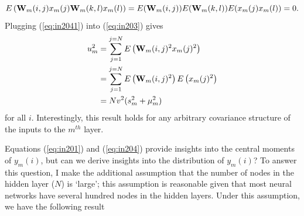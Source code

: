\documentclass[a4paper]{article}
\newcommand{\enum}[1]{\label{eq:#1}}
\newcommand{\eref}[1]{(\ref {eq:#1})}
\newcommand{\be}{\begin{equation}}
\newcommand{\ee}{\end{equation}}
\begin{document}
\newline
\be 
E\left({\bf{W}}_{m}(i,j)x_{m}(j){\bf{W}}_{m}(k,l)x_{m}(l)\right) = E({\bf{W}}_{m}(i,j))E({\bf{W}}_{m}(k,l))E(x_{m}(j)x_{m}(l)) = 0. \enum{in2041}
\ee
\newline
Plugging \eref{in2041} into \eref{in203} gives
\be 
\begin{split}
u_{m}^{2} &= \sum\limits_{j=1}^{j=N} E\left({\bf{W}}_{m}(i,j)^{2}x_{m}(j)^{2}\right) \\ 
&= \sum\limits_{j=1}^{j=N} E\left({\bf{W}}_{m}(i,j)^{2}\right)E\left(x_{m}(j)^{2}\right) \\  
&= Nv^{2}(s_{m}^{2} + \mu_{m}^{2}) \\ \enum{in204}
\end{split}
\ee
for all $i$. Interestingly, this result holds for any arbitrary covariance structure of the inputs to the $m^{th}$ layer. 

Equations \eref{in201} and \eref{in204} provide insights into the central moments of $y_{m}(i)$, but can we derive insights into the distribution of $y_{m}(i)$? To answer this question, I make the additional assumption that the number of nodes in the hidden layer ($N$) is `large'; this assumption is reasonable given that most neural networks have several hundred nodes in the hidden layers. Under this assumption, we have the following result 
\end{document}
